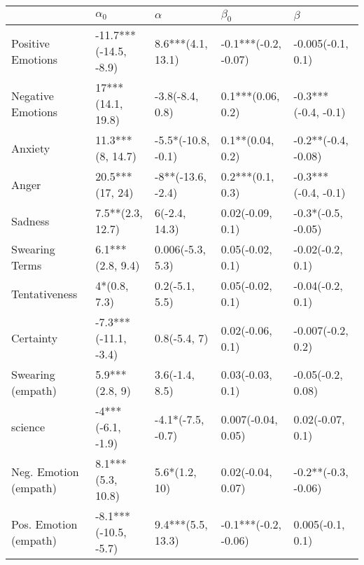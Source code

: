 \begin{tabular}{lllll}
\toprule
{} &             $\alpha_0$ &            $\alpha$ &             $\beta_0$ &              $\beta$ \\
\midrule
Positive Emotions     &  -11.7***(-14.5, -8.9) &   8.6***(4.1, 13.1) &  -0.1***(-0.2, -0.07) &    -0.005(-0.1, 0.1) \\
Negative Emotions     &      17***(14.1, 19.8) &     -3.8(-8.4, 0.8) &     0.1***(0.06, 0.2) &  -0.3***(-0.4, -0.1) \\
Anxiety               &       11.3***(8, 14.7) &  -5.5*(-10.8, -0.1) &      0.1**(0.04, 0.2) &  -0.2**(-0.4, -0.08) \\
Anger                 &        20.5***(17, 24) &   -8**(-13.6, -2.4) &      0.2***(0.1, 0.3) &  -0.3***(-0.4, -0.1) \\
Sadness               &       7.5**(2.3, 12.7) &       6(-2.4, 14.3) &      0.02(-0.09, 0.1) &   -0.3*(-0.5, -0.05) \\
Swearing Terms        &       6.1***(2.8, 9.4) &    0.006(-5.3, 5.3) &      0.05(-0.02, 0.1) &     -0.02(-0.2, 0.1) \\
Tentativeness         &           4*(0.8, 7.3) &      0.2(-5.1, 5.5) &      0.05(-0.02, 0.1) &     -0.04(-0.2, 0.1) \\
Certainty             &   -7.3***(-11.1, -3.4) &        0.8(-5.4, 7) &      0.02(-0.06, 0.1) &    -0.007(-0.2, 0.2) \\
Swearing (empath)     &         5.9***(2.8, 9) &      3.6(-1.4, 8.5) &      0.03(-0.03, 0.1) &    -0.05(-0.2, 0.08) \\
science               &      -4***(-6.1, -1.9) &   -4.1*(-7.5, -0.7) &    0.007(-0.04, 0.05) &     0.02(-0.07, 0.1) \\
Neg. Emotion (empath) &      8.1***(5.3, 10.8) &       5.6*(1.2, 10) &     0.02(-0.04, 0.07) &  -0.2**(-0.3, -0.06) \\
Pos. Emotion (empath) &   -8.1***(-10.5, -5.7) &   9.4***(5.5, 13.3) &  -0.1***(-0.2, -0.06) &     0.005(-0.1, 0.1) \\
\bottomrule
\end{tabular}
